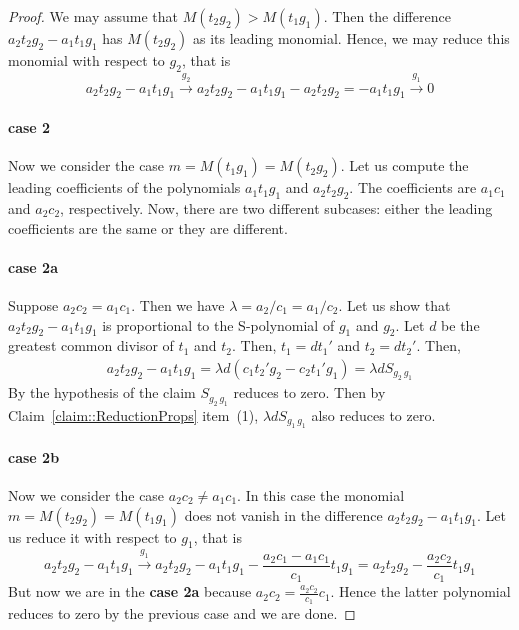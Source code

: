 \begin{proof}
We may assume that $M(t_2 g_2) > M(t_1 g_1)$.
Then the difference $a_2t_2g_2 - a_1 t_1 g_1$ has $M(t_2 g_2)$ as its leading monomial.
Hence, we may reduce this monomial with respect to $g_2$, that is
\[
a_2t_2g_2 - a_1 t_1 g_1\stackrel{g_2}{\longrightarrow} a_2t_2g_2 - a_1 t_1 g_1 - a_2t_2 g_2 = - a_1 t_1 g_1 \stackrel{g_1}{\longrightarrow} 0
\]

\paragraph{case 2}

Now we consider the case $m = M(t_1 g_1) = M(t_2 g_2)$.
Let us compute the leading coefficients of the polynomials $a_1t_1 g_1$ and $a_2 t_2 g_2$.
The coefficients are $a_1 c_1$ and $a_2 c_2$, respectively.
Now, there are two different subcases: either the leading coefficients are the same or they are different.

\paragraph{case 2a}

Suppose $a_2 c_2 = a_1 c_1$.
Then we have $\lambda = a_2 / c_1 = a_1 / c_2$.
Let us show that $a_2t_2g_2 - a_1 t_1 g_1$ is proportional to the S-polynomial of $g_1$ and $g_2$.
Let $d$ be the greatest common divisor of $t_1$ and $t_2$.
Then, $t_1 = d t_1'$ and $t_2 = d t_2'$.
Then,
\begin{gather*}
a_2t_2g_2 - a_1 t_1 g_1 = \lambda d \left(c_1 t_2' g_2 - c_2 t_1' g_1\right) = \lambda d S_{g_2\,g_1}
\end{gather*}
By the hypothesis of the claim $S_{g_2\, g_1}$ reduces to zero.
Then by Claim~\ref{claim::ReductionProps} item~(1), $\lambda d S_{g_1\,g_1}$ also reduces to zero.

\paragraph{case 2b}

Now we consider the case $a_2 c_2 \neq a_1 c_1$.
In this case the monomial $m = M(t_2 g_2) = M(t_1 g_1)$ does not vanish in the difference $a_2t_2g_2 - a_1 t_1 g_1$.
Let us reduce it with respect to $g_1$, that is
\[
a_2t_2g_2 - a_1 t_1 g_1 \stackrel{g_1}{\longrightarrow}
a_2t_2g_2 - a_1 t_1 g_1 - \frac{a_2 c_1 - a_1 c_1}{c_1}t_1 g_1 = a_2 t_2 g_2 - \frac{a_2 c_2}{c_1}t_1 g_1
\]
But now we are in the \textbf{case 2a} because $a_2 c_2 = \frac{a_2 c_2}{c_1}c_1$.
Hence the latter polynomial reduces to zero by the previous case and we are done.
\end{proof}

